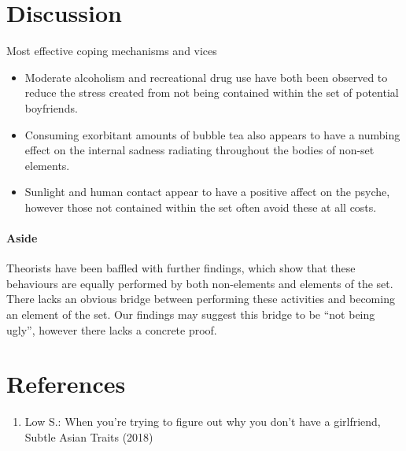 \documentclass[11pt]{extarticle}
\theoremstyle{definition}
\begin{document}
\section*{Discussion}
Most effective coping mechanisms and vices
\begin{itemize}
    \item Moderate alcoholism and recreational drug use have both been observed to reduce the stress created from not being contained within the set of potential boyfriends. 
    \item Consuming exorbitant amounts of bubble tea also appears to have a numbing effect on the internal sadness radiating throughout the bodies of non-set elements.
    \item Sunlight and human contact appear to have a positive affect on the psyche, however those not contained within the set often avoid these at all costs.
\end{itemize}

\paragraph{Aside} Theorists have been baffled with further findings, which show that these behaviours are equally performed by both non-elements and elements of the set. There lacks an obvious bridge between performing these activities and becoming an element of the set. Our findings may suggest this bridge to be “not being ugly”, however there lacks a concrete proof.

\section*{References}
\begin{enumerate}
    \item Low S.: When you’re trying to figure out why you don’t have a girlfriend, Subtle Asian Traits (2018)
\end{enumerate}
\end{document}
